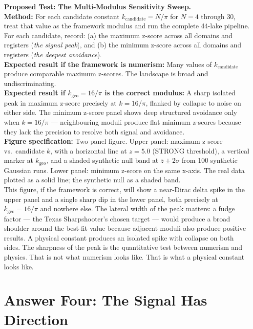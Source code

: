 \documentclass[11pt, letterpaper, openany]{book}
\begin{document}
\begin{predictionbox}
\textbf{Proposed Test: The Multi-Modulus Sensitivity Sweep.}\\[0.5em]
\textbf{Method:} For each candidate constant $k_\text{candidate} = N/\pi$
for $N = 4$ through $30$, treat that value as the framework modulus and
run the complete 44-lake pipeline. For each candidate, record: (a) the
maximum z-score across all domains and registers (\textit{the signal
peak}), and (b) the minimum z-score across all domains and registers
(\textit{the deepest avoidance}).\\[0.5em]
\textbf{Expected result if the framework is numerism:}
Many values of $k_\text{candidate}$ produce comparable maximum z-scores.
The landscape is broad and undiscriminating.\\[0.5em]
\textbf{Expected result if $k_\text{geo} = 16/\pi$ is the correct modulus:}
A sharp isolated peak in maximum z-score precisely at $k = 16/\pi$,
flanked by collapse to noise on either side. The minimum z-score panel
shows deep structured avoidance only when $k = 16/\pi$ --- neighbouring
moduli produce flat minimum z-scores because they lack the precision
to resolve both signal and avoidance.\\[0.5em]
\textbf{Figure specification:} Two-panel figure. Upper panel: maximum
z-score vs.\ candidate $k$, with a horizontal line at $z = 5.0$
(STRONG threshold), a vertical marker at $k_\text{geo}$, and a shaded
synthetic null band at $\bar{z} \pm 2\sigma$ from 100 synthetic Gaussian
runs. Lower panel: minimum z-score on the same x-axis. The real data
plotted as a solid line; the synthetic null as a shaded band.\\[0.5em]
This figure, if the framework is correct, will show a near-Dirac delta spike
in the upper panel and a single sharp dip in the lower panel, both precisely
at $k_\text{geo} = 16/\pi$ and nowhere else. The lateral width of the peak
matters: a fudge factor --- the Texas Sharpshooter's chosen target ---
would produce a broad shoulder around the best-fit value because adjacent
moduli also produce positive results. A physical constant produces an
isolated spike with collapse on both sides. The sharpness of the peak
is the quantitative test between numerism and physics.
That is not what numerism looks like. That is what a physical constant looks like.
\end{predictionbox}

\section{Answer Four: The Signal Has Direction}
\end{document}
